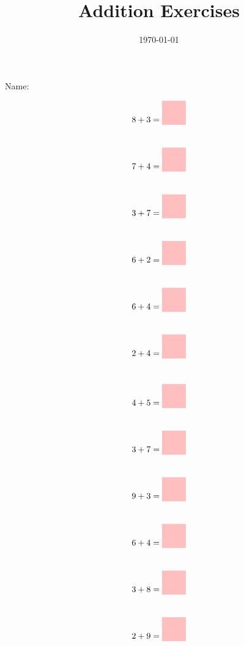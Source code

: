 \documentclass[14pt]{extarticle}
\title{Addition Exercises}
\author{}
\date{\Large\today}
\newcommand{\blankbox}{\colorbox{pink}{\rule{22pt}{0pt}\rule{0pt}{22pt}}}
\begin{document}
\maketitle

\noindent Name: \underline{\hspace{6cm}}
\vspace{1cm}

\huge
\begin{multicols}{2}
\noindent\begin{align*}
    8 + 3 &= \blankbox \\[22pt]
    7 + 4 &= \blankbox \\[22pt]
    3 + 7 &= \blankbox \\[22pt]
    6 + 2 &= \blankbox \\[22pt]
    6 + 4 &= \blankbox \\[22pt]
    2 + 4 &= \blankbox \\[22pt]
\end{align*}
\columnbreak
\noindent\begin{align*}
    4 + 5 &= \blankbox \\[22pt]
    3 + 7 &= \blankbox \\[22pt]
    9 + 3 &= \blankbox \\[22pt]
    6 + 4 &= \blankbox \\[22pt]
    3 + 8 &= \blankbox \\[22pt]
    2 + 9 &= \blankbox \\[22pt]
\end{align*}
\end{multicols}

\end{document}
